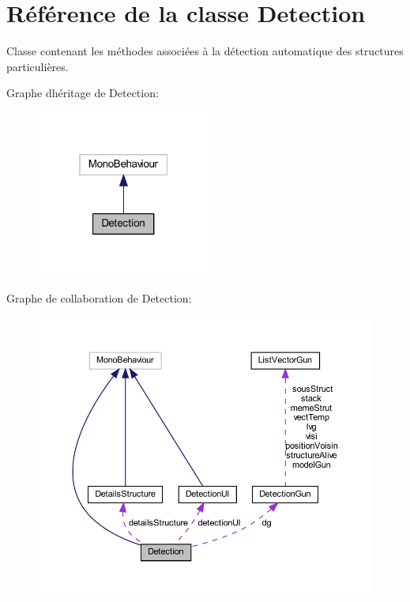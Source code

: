 \hypertarget{class_detection}{}\section{Référence de la classe Detection}
\label{class_detection}


Classe contenant les méthodes associées à la détection automatique des structures particulières.  




Graphe d\textquotesingle{}héritage de Detection\+:\nopagebreak
\begin{figure}[H]
\begin{center}
\leavevmode
\includegraphics[width=163pt]{class_detection__inherit__graph}
\end{center}
\end{figure}


Graphe de collaboration de Detection\+:
\nopagebreak
\begin{figure}[H]
\begin{center}
\leavevmode
\includegraphics[width=350pt]{class_detection__coll__graph}
\end{center}
\end{figure}
